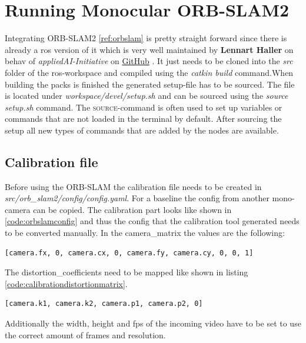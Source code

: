 \section{Running Monocular ORB-SLAM2\authorA}\label{ref:runningmonocularorbslam}
Integrating ORB-SLAM2 \ref{ref:orbslam} is pretty straight forward since there is already a \gls{ros} version of it which is very well maintained by \textbf{Lennart Haller} on behav of \textit{appliedAI-Initiative} on \href{https://github.com/appliedAI-Initiative/orb_slam_2_ros}{GitHub} \cite{orbslam2rosgithub}. It just needs to be cloned into the \textit{src} folder of the \gls{ros}-workspace and compiled using the \textit{catkin build} command.When building the packs is finished the generated setup-file has to be sourced. The file is located under \textit{workspace/devel/setup.sh} and can be sourced using the \textit{source setup.sh} command. The \textsc{source}-command is often used to set up variables or commands that are not loaded in the terminal by default. After sourcing the setup all new types of commands that are added by the nodes are available.

\subsection{Calibration file}\label{ref:calibrationorbslam}
Before using the ORB-SLAM the calibration file needs to be created in \textit{src/orb\_slam2/config/config.yaml}. For a baseline the config from another mono-camera can be copied. The calibration part looks like shown in \ref{code:orbslamconfig} and thus the config that the calibration tool generated needs to be converted manually. In the camera\_matrix the values are the following:\newline
\begin{lstlisting}[language=XML,caption={Matrix listing},label={code:calibrationmatrix}]
	  	[camera.fx, 0, camera.cx, 0, camera.fy, camera.cy, 0, 0, 1]
\end{lstlisting}
The distortion\_coefficients need to be mapped like shown in listing \ref{code:calibrationdistortionmatrix}.\newline
\begin{lstlisting}[language=XML,caption={Matrix listing},label={code:calibrationdistortionmatrix}]
	  	[camera.k1, camera.k2, camera.p1, camera.p2, 0]
\end{lstlisting}
Additionally the width, height and \gls{fps} of the incoming video have to be set to use the correct amount of frames and resolution.\newline


